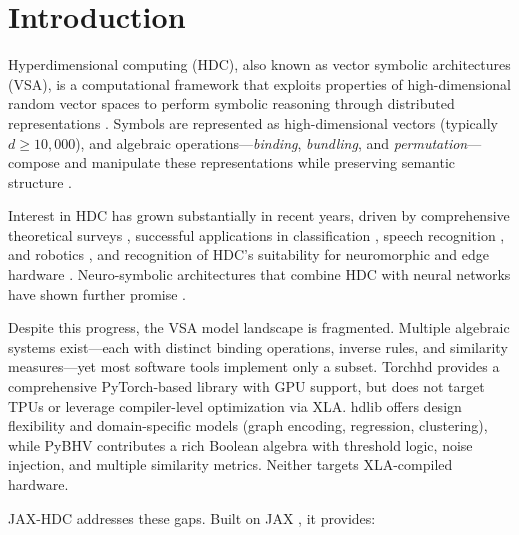 \documentclass[twoside,11pt]{article}
\begin{document}
\section{Introduction}

Hyperdimensional computing (HDC), also known as vector symbolic architectures (VSA), is a computational framework that exploits properties of high-dimensional random vector spaces to perform symbolic reasoning through distributed representations \citep{kanerva2009hyperdimensional, gayler2003vector}. Symbols are represented as high-dimensional vectors (typically $d \geq 10{,}000$), and algebraic operations---\emph{binding}, \emph{bundling}, and \emph{permutation}---compose and manipulate these representations while preserving semantic structure \citep{plate1995holographic, kanerva2010dollar}.

Interest in HDC has grown substantially in recent years, driven by comprehensive theoretical surveys \citep{kleyko2022survey1, kleyko2022survey2}, successful applications in classification \citep{rahimi2016robust}, speech recognition \citep{imani2017voicehd}, and robotics \citep{neubert2019introduction}, and recognition of HDC's suitability for neuromorphic and edge hardware \citep{kleyko2022vector}. Neuro-symbolic architectures that combine HDC with neural networks have shown further promise \citep{hersche2023neuro}.

Despite this progress, the VSA model landscape is fragmented. Multiple algebraic systems exist---each with distinct binding operations, inverse rules, and similarity measures---yet most software tools implement only a subset. Torchhd \citep{heddes2023torchhd} provides a comprehensive PyTorch-based library with GPU support, but does not target TPUs or leverage compiler-level optimization via XLA. hdlib \citep{cumbo2023hdlib} offers design flexibility and domain-specific models (graph encoding, regression, clustering), while PyBHV \citep{vandervorst2023pybhv} contributes a rich Boolean algebra with threshold logic, noise injection, and multiple similarity metrics. Neither targets XLA-compiled hardware.

JAX-HDC addresses these gaps. Built on JAX \citep{jax2018github}, it provides:
\end{document}

